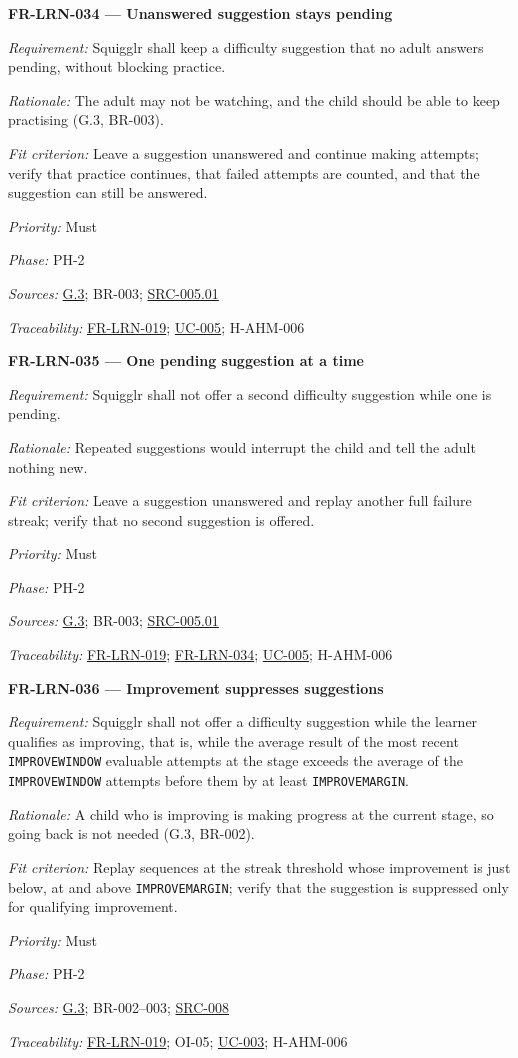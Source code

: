 \documentclass[12pt]{article}
\renewcommand{\_}{\textunderscore\allowbreak}%
\newcommand{\goalref}[1]{\hyperref[goal:#1]{G.#1}}
\newcommand{\ucref}[1]{\hyperref[uc:#1]{\mbox{UC-#1}}}
\newenvironment{srsrequirement}[2]{%
  \par\medskip\noindent\phantomsection\label{req:#1}%
  \textbf{#1 --- #2}\par\nobreak\smallskip }{\par\medskip}
\newcommand{\reqfield}[2]{\noindent\textit{#1:} #2\par}
\newcommand{\reqshall}[1]{\reqfield{Requirement}{#1}}
\newcommand{\reqrationale}[1]{\reqfield{Rationale}{#1}}
\newcommand{\reqfit}[1]{\reqfield{Fit criterion}{#1}}
\newcommand{\reqpriority}[1]{\reqfield{Priority}{#1}}
\newcommand{\reqphase}[1]{\reqfield{Phase}{#1}}
\newcommand{\reqsources}[1]{\reqfield{Sources}{#1}}
\newcommand{\reqtraces}[1]{\reqfield{Traceability}{#1}}
\newcommand{\reqref}[1]{\hyperref[req:#1]{#1}}
\newcommand{\srcref}[1]{\hyperref[src:#1]{SRC-#1}}
\providecommand{\ucref}[1]{\hyperref[uc:#1]{UC-#1}}
\begin{document}
\begin{srsrequirement}{FR-LRN-034}{Unanswered suggestion stays pending}
  \reqshall{Squigglr shall keep a difficulty suggestion that no adult answers
pending, without blocking practice.} \reqrationale{The adult may not be
watching, and the child should be able to keep practising (G.3, BR-003).}
\reqfit{Leave a suggestion unanswered and continue making attempts; verify that
practice continues, that failed attempts are counted, and that the suggestion
can still be answered.}
  \reqpriority{Must}
  \reqphase{PH-2}
  \reqsources{\goalref{3}; BR-003; \hyperref[src:005.01]{SRC-005.01}}
  \reqtraces{\reqref{FR-LRN-019}; \ucref{005}; H-AHM-006}
\end{srsrequirement}

\begin{srsrequirement}{FR-LRN-035}{One pending suggestion at a time}
  \reqshall{Squigglr shall not offer a second difficulty suggestion while one is
pending.} \reqrationale{Repeated suggestions would interrupt the child and tell
the adult nothing new.} \reqfit{Leave a suggestion unanswered and replay
another full failure streak; verify that no second suggestion is offered.}
  \reqpriority{Must}
  \reqphase{PH-2}
  \reqsources{\goalref{3}; BR-003; \hyperref[src:005.01]{SRC-005.01}}
  \reqtraces{\reqref{FR-LRN-019}; \reqref{FR-LRN-034}; \ucref{005}; H-AHM-006}
\end{srsrequirement}

\begin{srsrequirement}{FR-LRN-036}{Improvement suppresses suggestions}
  \reqshall{Squigglr shall not offer a difficulty suggestion while the learner
qualifies as improving, that is, while the average result of the most recent
\texttt{IMPROVE\_\allowbreak WINDOW} evaluable attempts at the stage exceeds the
average of the \texttt{IMPROVE\_\allowbreak WINDOW} attempts before them by at
least \texttt{IMPROVE\_\allowbreak MARGIN}.} \reqrationale{A child who is
improving is making progress at the current stage, so going back is not needed
(G.3, BR-002).} \reqfit{Replay sequences at the streak threshold whose
improvement is just below, at and above \texttt{IMPROVE\_MARGIN}; verify that
the suggestion is suppressed only for qualifying improvement.}
  \reqpriority{Must}
  \reqphase{PH-2}
  \reqsources{\goalref{3}; BR-002--003; \srcref{008}}
  \reqtraces{\reqref{FR-LRN-019}; OI-05; \ucref{003}; H-AHM-006}
\end{srsrequirement}
\end{document}
